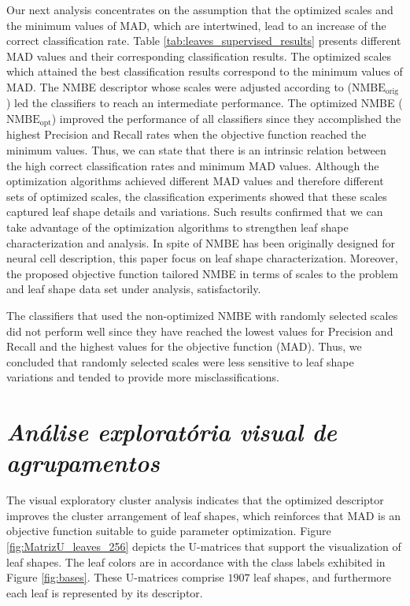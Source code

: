 {{Our next analysis concentrates on the assumption that the optimized scales and the minimum values of MAD, which are intertwined, lead to an increase of the correct classification rate.
Table \ref{tab:leaves_supervised_results} presents different MAD values and their corresponding classification results. The optimized scales which attained the best classification results correspond to the minimum values of MAD. The NMBE descriptor whose scales were adjusted according to  ($\operatorname{NMBE_{orig}}$) led the classifiers to reach an intermediate performance. The optimized NMBE ($\operatorname{NMBE_{opt}}$) improved the performance of all classifiers since they accomplished the highest Precision and Recall rates when the objective function reached the minimum values. Thus, we can state that there is an intrinsic relation between the high correct classification rates and minimum MAD values.
Although the optimization algorithms achieved different MAD values and therefore different sets of optimized scales, the classification experiments showed that these scales captured leaf shape details and variations. Such results confirmed that we can take advantage of the optimization algorithms to strengthen leaf shape characterization and analysis. 
In spite of NMBE has been originally designed for neural cell description, this paper focus on leaf shape characterization. Moreover, the proposed objective function tailored NMBE in terms of scales to the problem and leaf shape data set under analysis, satisfactorily. 
  
The classifiers that used the non-optimized NMBE with randomly selected scales did not perform well since they have reached the lowest values for Precision and Recall and the highest values for the objective function (MAD). 
Thus, we concluded that randomly selected scales were less sensitive to leaf shape variations and tended to provide more misclassifications. 


\section{\emph{Análise exploratória visual de agrupamentos}}
The visual exploratory cluster analysis indicates that the optimized descriptor improves the cluster arrangement of leaf shapes, which reinforces that MAD is an objective function suitable to guide parameter optimization. 
Figure \ref{fig:MatrizU_leaves_256}  depicts the U-matrices that support the visualization of leaf shapes. The leaf colors are in accordance with the class labels exhibited in Figure \ref {fig:bases}. These U-matrices comprise $1907$ leaf shapes, and furthermore each leaf is represented by its descriptor. 

}}
